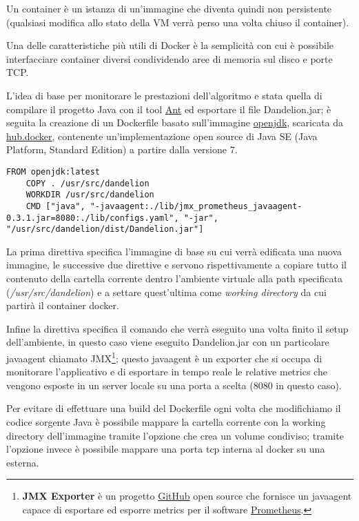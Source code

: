 Un container è un istanza di un'immagine che diventa quindi non persistente (qualsiasi modifica allo stato della VM verrà perso una volta chiuso il container). 

Una delle caratteristiche più utili di Docker è la semplicità con cui è possibile interfacciare container diversi condividendo aree di memoria sul disco e porte TCP.

L'idea di base per monitorare le prestazioni dell'algoritmo e stata quella di compilare il progetto Java con il tool \href{https://ant.apache.org/}{Ant} ed esportare il file Dandelion.jar; 
è seguita la creazione di un Dockerfile basato sull'immagine \href{https://hub.docker.com/_/openjdk/}{openjdk}, 
scaricata da \href{https://hub.docker.com/}{hub.docker}, contenente un'implementazione open source di Java SE (Java Platform, Standard Edition) a partire dalla versione 7. 

\begin{lstlisting}[style=YmlStyle, caption=Dockerfile]
    FROM openjdk:latest
    COPY . /usr/src/dandelion
    WORKDIR /usr/src/dandelion
    CMD ["java", "-javaagent:./lib/jmx_prometheus_javaagent-0.3.1.jar=8080:./lib/configs.yaml", "-jar", "/usr/src/dandelion/dist/Dandelion.jar"]
\end{lstlisting}

La prima direttiva  specifica l'immagine di base su cui verrà edificata una nuova immagine, le successive due direttive  e  servono rispettivamente a copiare 
tutto il contenuto della cartella corrente dentro l'ambiente virtuale alla path specificata (\textit{/usr/src/dandelion}) e a settare quest'ultima come \textit{working directory} da cui partirà il container docker. 

Infine la direttiva  specifica il comando che verrà eseguito una volta finito il setup dell'ambiente, in questo caso viene eseguito Dandelion.jar con un particolare javaagent chiamato JMX\footnote{
    \textbf{JMX Exporter} è un progetto \href{https://github.com/prometheus/jmx_exporter}{GitHub} open source che fornisce un javaagent capace di esportare ed esporre metrics per il software \href{https://prometheus.io/}{Prometheus}.
};
questo javaagent è un exporter che si occupa di monitorare l'applicativo e di esportare in tempo reale le relative metrics che vengono esposte in un server locale su una porta a scelta (8080 in questo caso).

Per evitare di effettuare una build del Dockerfile ogni volta che modifichiamo il codice sorgente Java è possibile mappare la cartella corrente con la working directory dell'immagine tramite l'opzione 
che crea un volume condiviso; tramite l'opzione  invece è possibile mappare una porta tcp interna al docker su una esterna.

